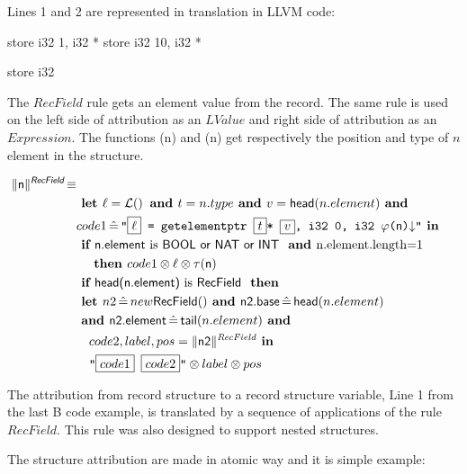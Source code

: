 Lines 1 and 2 are represented in translation in LLVM code:

\begin{llvmcode}
store i32 1, i32 * %
store i32 10, i32 * %

store i32 %
\end{llvmcode}

The $RecField$ rule gets an element value from the record. The same rule is 
used on the left side of attribution as an $LValue$ and right side of 
attribution as an $Expression$. The functions \SBPos(n) and \SBType(n)  get 
respectively the position and type of $n$ element in the structure. 

\begin{align*}
\begin{split}
  \trad{n}{\B{RecField}} \isdef \\
   &\LET \ell = \lbl  \AND  t = n.type \AND v = \B{head}(n.element) \AND\\
   &code1 \BE \llvm{"\PH{\ell} = getelementptr \PH{t}* \PH{v}, i32 0, i32  \SBPos(\B{n})\nl"} \IN \\
   &\IF \B{n.element} \mbox{ is \B{BOOL or NAT or INT} \AND n.element.length=1}\\
   &\quad \THEN  code1 \sep  \ell  \sep \SBType(\B{n})\\
   &\IF \B{head(n.element)} \mbox{ is \B{RecField} }  \THEN \\
   &\LET n2 \BE new \B{RecField}() \AND  \B{n2.base}  \BE \B{head}(n.element)\\
   &\AND \B{n2.element} \BE \B{tail}(n.element) \AND \\
   &\quad code2, label, pos = \trad{n2}{RecField} \IN\\
   &\quad \llvm{"\PH{code1} \PH{code2}"} \sep  label  \sep pos \\
\end{split}
\end{align*}

The attribution from record structure to a record structure variable, Line 1 
from the last B code example, is translated by a sequence of applications of
the  rule $RecField$. This rule was also designed to support nested structures.

The structure attribution are made in atomic way and it is simple example:

